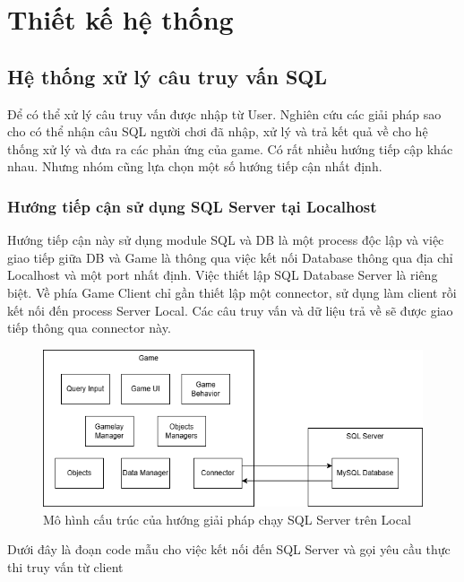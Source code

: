 \section{Thiết kế hệ thống}
\subsection{Hệ thống xử lý câu truy vấn SQL}
\hspace*{0.5cm} Để có thể xử lý câu truy vấn được nhập từ User. Nghiên cứu các giải pháp sao cho có thể nhận câu SQL người chơi đã nhập, xử lý và trả kết quả về cho hệ thống xử lý và đưa ra các phản ứng của game. Có rất nhiều hướng tiếp cập khác nhau. Nhưng nhóm cũng lựa chọn một số hướng tiếp cận nhất định.
\subsubsection{Hướng tiếp cận sử dụng SQL Server tại Localhost}
\hspace*{0.5cm} Hướng tiếp cận này sử dụng module SQL và DB là một process độc lập và việc giao tiếp giữa DB và Game là thông qua việc kết nối Database thông qua địa chỉ Localhost và một port nhất định. Việc thiết lập SQL Database Server là riêng biệt. Về phía Game Client chỉ gần thiết lập một connector, sử dụng làm client rồi kết nối đến process Server Local. Các câu truy vấn và dữ liệu trả về sẽ được giao tiếp thông qua connector này.
\begin{figure}[H]
	\centering
	\includegraphics[width=\textwidth]{Images/SQLLocalServer.png}
	\vspace{0.5cm}
	\caption{Mô hình cấu trúc của hướng giải pháp chạy SQL Server trên Local}
\end{figure}
Dưới đây là đoạn code mẫu cho việc kết nối đến SQL Server và gọi yêu cầu thực thi truy vấn từ client\\
